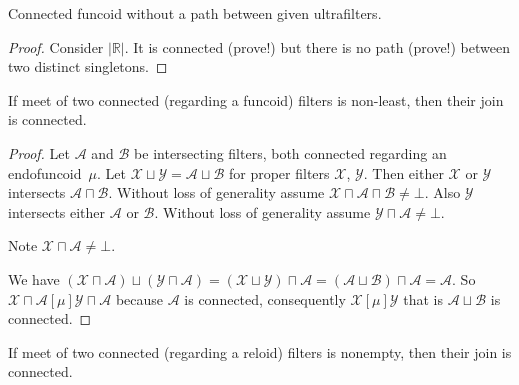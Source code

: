 \begin{example}
  Connected funcoid without a path between given ultrafilters.
\end{example}

\begin{proof}
  Consider $| \mathbb{R} |$. It is connected (prove!) but there is no
  path (prove!) between two distinct singletons.
\end{proof}

\begin{thm}
  If meet of two connected (regarding a funcoid) filters is non-least,
  then their join is connected.
\end{thm}

\begin{proof}
Let $\mathcal{A}$ and $\mathcal{B}$ be intersecting filters, both
connected regarding an endofuncoid~$\mu$. Let $\mathcal{X}
\sqcup \mathcal{Y} = \mathcal{A} \sqcup \mathcal{B}$ for proper filters
$\mathcal{X}$, $\mathcal{Y}$. Then either $\mathcal{X}$ or $\mathcal{Y}$
intersects $\mathcal{A} \sqcap \mathcal{B}$. Without loss of generality assume
$\mathcal{X} \sqcap \mathcal{A} \sqcap \mathcal{B} \neq \bot$.
Also $\mathcal{Y}$ intersects
either $\mathcal{A}$ or $\mathcal{B}$. Without loss of generality assume
$\mathcal{Y} \sqcap \mathcal{A} \neq \bot$.

Note $\mathcal{X} \sqcap \mathcal{A} \neq \bot$.

We have $(\mathcal{X} \sqcap \mathcal{A}) \sqcup (\mathcal{Y} \sqcap
\mathcal{A}) = (\mathcal{X} \sqcup \mathcal{Y}) \sqcap \mathcal{A} =
(\mathcal{A} \sqcup \mathcal{B}) \sqcap \mathcal{A} = \mathcal{A}$. So
$\mathcal{X} \sqcap \mathcal{A} \mathrel{[\mu]} \mathcal{Y} \sqcap
\mathcal{A}$ because $\mathcal{A}$ is connected, consequently $\mathcal{X}
\mathrel{[\mu]} \mathcal{Y}$ that is $\mathcal{A} \sqcup \mathcal{B}$ is
connected.
\end{proof}

\begin{thm}
  If meet of two connected (regarding a reloid) filters is nonempty, then
  their join is connected.
\end{thm}

